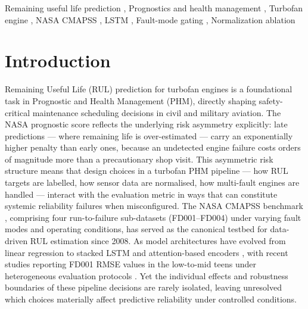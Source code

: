 \documentclass[review,12pt]{elsarticle}
\begin{document}
\begin{frontmatter}
\begin{abstract}
These findings suggest that upstream design decisions --- RUL clipping and sensor normalisation --- produce larger and more consistent performance differences than downstream choices --- fault-mode routing and loss function --- in the present CMAPSS experiments; gate confidence is proposed as a post-training diagnostic for routing decisiveness, with a practical design checklist summarising observed priorities as a structured starting point requiring validation on representative fleet data before operational deployment.
\end{abstract}

\begin{keyword}
Remaining useful life prediction \sep
Prognostics and health management \sep
Turbofan engine \sep
NASA CMAPSS \sep
LSTM \sep
Fault-mode gating \sep
Normalization ablation
\end{keyword}

\end{frontmatter}

\linenumbers


\section{Introduction}

Remaining Useful Life (RUL) prediction for turbofan engines is a foundational task in Prognostic and Health Management (PHM), directly shaping safety-critical maintenance scheduling decisions in civil and military aviation. The NASA prognostic score reflects the underlying risk asymmetry explicitly: late predictions — where remaining life is over-estimated — carry an exponentially higher penalty than early ones, because an undetected engine failure costs orders of magnitude more than a precautionary shop visit. This asymmetric risk structure means that design choices in a turbofan PHM pipeline — how RUL targets are labelled, how sensor data are normalised, how multi-fault engines are handled — interact with the evaluation metric in ways that can constitute systemic reliability failures when misconfigured. The NASA CMAPSS benchmark \cite{ref01}, comprising four run-to-failure sub-datasets (FD001–FD004) under varying fault modes and operating conditions, has served as the canonical testbed for data-driven RUL estimation since 2008. As model architectures have evolved from linear regression \cite{ref02} to stacked LSTM \cite{ref05,ref06} and attention-based encoders \cite{ref13,ref14,ref45}, with recent studies reporting FD001 RMSE values in the low-to-mid teens under heterogeneous evaluation protocols \cite{ref13,ref15,ref29}. Yet the individual effects and robustness boundaries of these pipeline decisions are rarely isolated, leaving unresolved which choices materially affect predictive reliability under controlled conditions.
\end{document}

